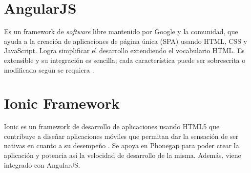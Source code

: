\section{AngularJS} \label{sect:AngularJS}
Es un framework de \textit{software} libre mantenido por Google y la comunidad, que ayuda a la creación de aplicaciones de página única (SPA) usando HTML, CSS y JavaScript. Logra simplificar el desarrollo extendiendo el vocabulario HTML. Es extensible y su integración es sencilla; cada característica puede ser sobrescrita o modificada según se requiera \cite{ANGULAR}.

\section{Ionic Framework} \label{sect:Ionic Framework}
Ionic es un framework de desarrollo de aplicaciones usando HTML5 que contribuye a diseñar aplicaciones móviles que permitan dar la sensación de ser nativas en cuanto a su desempeño \cite{IONIC}. Se apoya en Phonegap para poder crear la aplicación y potencia así la velocidad de desarrollo de la misma. Además, viene integrado con AngularJS. 
